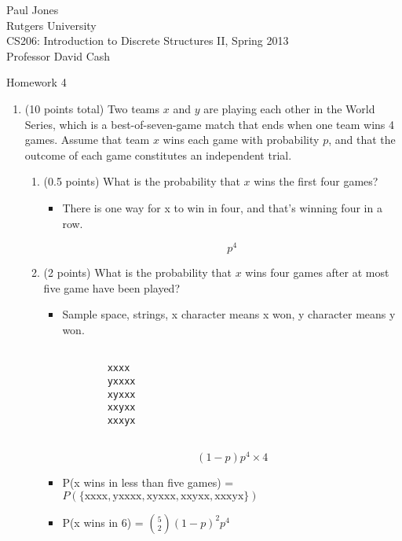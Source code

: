 \documentclass[11pt]{article}
\begin{document}
\sloppy

\noindent Paul Jones \\
Rutgers University\\
CS206: Introduction to Discrete Structures II, Spring 2013\\
Professor David Cash\\

\begin{center}
Homework 4
\end{center}

\begin{enumerate}


\item (10 points total) Two teams $x$ and $y$ are playing each other in the
World Series, which is a best-of-seven-game match that ends when one
team wins 4 games.  Assume that team $x$ wins each game with probability
$p$, and that the outcome of each game constitutes an independent trial.

\begin{enumerate}
	\item (0.5 points) What is the probability that $x$ wins the first four games?
	
	\begin{itemize}
	
		\item There is one way for x to win in four, and that's winning four in a row.
		
			  \[p^4\]
	
	\end{itemize}
	
	\item (2 points) What is the probability that $x$ wins four games after
	at most five game have been played?
	
	\begin{itemize}
		\item Sample space, strings, x character means x won, y character means y won.
		
		\begin{verbatim}
		
		xxxx
		yxxxx
		xyxxx
		xxyxx
		xxxyx
		
		\end{verbatim}
		
		\[(1 - p) p^4 \times 4 \]
		
		\item P(x wins in less than five games) = $P(\mathrm{\{xxxx, yxxxx, xyxxx, xxyxx, xxxyx\}})$
		\item P(x wins in 6) = ${5 \choose 2}(1 - p)^2 p^4$
		

\end{itemize}
\end{enumerate}
\end{enumerate}
\end{document}
